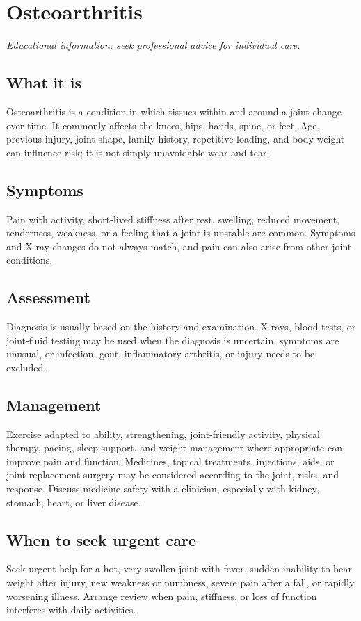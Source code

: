 \chapter{Osteoarthritis}

\medskip
\noindent\textit{Educational information; seek professional advice for individual care.}

\section*{What it is}
Osteoarthritis is a condition in which tissues within and around a joint change over time. It commonly affects the knees, hips, hands, spine, or feet. Age, previous injury, joint shape, family history, repetitive loading, and body weight can influence risk; it is not simply unavoidable wear and tear.

\section*{Symptoms}
Pain with activity, short-lived stiffness after rest, swelling, reduced movement, tenderness, weakness, or a feeling that a joint is unstable are common. Symptoms and X-ray changes do not always match, and pain can also arise from other joint conditions.

\section*{Assessment}
Diagnosis is usually based on the history and examination. X-rays, blood tests, or joint-fluid testing may be used when the diagnosis is uncertain, symptoms are unusual, or infection, gout, inflammatory arthritis, or injury needs to be excluded.

\section*{Management}
Exercise adapted to ability, strengthening, joint-friendly activity, physical therapy, pacing, sleep support, and weight management where appropriate can improve pain and function. Medicines, topical treatments, injections, aids, or joint-replacement surgery may be considered according to the joint, risks, and response. Discuss medicine safety with a clinician, especially with kidney, stomach, heart, or liver disease.

\section*{When to seek urgent care}
Seek urgent help for a hot, very swollen joint with fever, sudden inability to bear weight after injury, new weakness or numbness, severe pain after a fall, or rapidly worsening illness. Arrange review when pain, stiffness, or loss of function interferes with daily activities.

